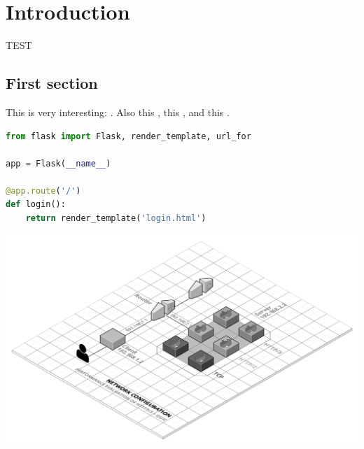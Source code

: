 \chapter{Introduction}

TEST

\section{First section}

This is very interesting: \cite{coulouris}. Also this \cite{donoho}, this \cite{ictbusiness}, and this \cite{dalal}.

\begin{code}[Implementation]
    \begin{lstlisting}[language=Python]
from flask import Flask, render_template, url_for

app = Flask(__name__)

@app.route('/')
def login():
    return render_template('login.html')
    \end{lstlisting}
\end{code}

\begin{center}
    \includegraphics[scale=0.25]{imgs/DNCS-2.png}
\end{center}